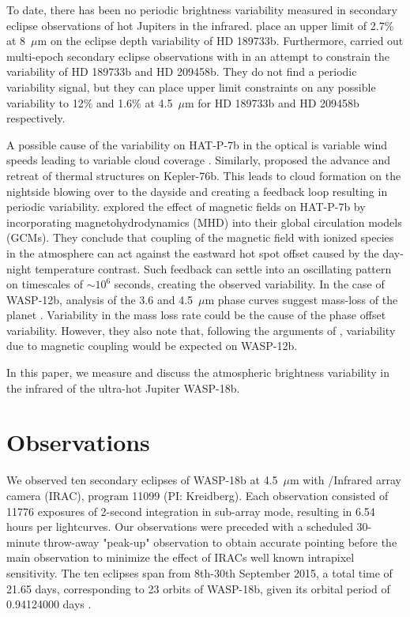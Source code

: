 To date, there has been no periodic brightness variability measured in secondary eclipse observations of hot Jupiters in the infrared. \citet{Agol2010} place an upper limit of 2.7\% at 8~$\mu$m on the eclipse depth variability of HD 189733b. Furthermore, \citet{Kilpatrick2020} carried out multi-epoch secondary eclipse observations with \spitzerIRAC in an attempt to constrain the variability of HD 189733b and HD 209458b. They do not find a periodic variability signal, but they can place upper limit constraints on any possible variability to 12\% and 1.6\% at 4.5~$\mu$m for HD 189733b and HD 209458b respectively.

A possible cause of the variability on HAT-P-7b in the optical is variable wind speeds leading to variable cloud coverage \citep{Armstrong2016}. Similarly, \citet{Jackson2019} proposed the advance and retreat of thermal structures on Kepler-76b. This leads to cloud formation on the nightside blowing over to the dayside and creating a feedback loop resulting in periodic variability. \citet{Rogers2017} explored the effect of magnetic fields on HAT-P-7b by incorporating magnetohydrodynamics (MHD) into their global circulation models (GCMs). They conclude that coupling of the magnetic field with ionized species in the atmosphere can act against the eastward hot spot offset caused by the day-night temperature contrast. Such feedback can settle into an oscillating pattern on timescales of $\sim10^6$ seconds, creating the observed variability. In the case of WASP-12b, analysis of the 3.6 and 4.5~$\mu$m phase curves suggest mass-loss of the planet \citep{Bell2019}. Variability in the mass loss rate could be the cause of the phase offset variability. However, they also note that, following the arguments of \citet{Rogers2017}, variability due to magnetic coupling would be expected on WASP-12b.

In this paper, we measure and discuss the atmospheric brightness variability in the infrared of the ultra-hot Jupiter WASP-18b.

\section{Observations}

We observed ten secondary eclipses of WASP-18b at 4.5~$\mu$m with \spitzer/Infrared array camera (IRAC), program 11099 (PI: Kreidberg). Each observation consisted of 11776 exposures of 2-second integration in sub-array mode, resulting in 6.54 hours per lightcurves. Our observations were preceded with a scheduled 30-minute throw-away "peak-up" observation to obtain accurate pointing before the main observation to minimize the effect of IRACs well known intrapixel sensitivity. The ten eclipses span from 8th-30th September 2015, a total time of 21.65 days, corresponding to 23 orbits of WASP-18b, given its orbital period of 0.94124000 days \citep{Pearson2019}.

